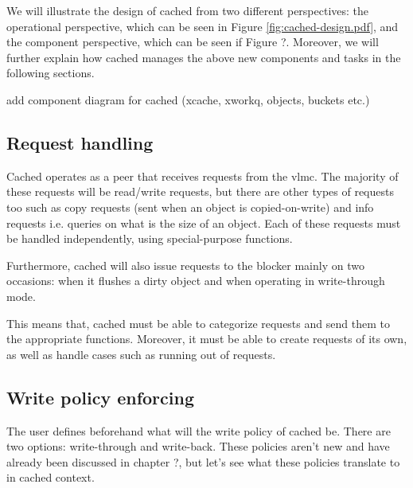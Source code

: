 We will illustrate the design of cached from two different perspectives: the 
operational perspective, which can be seen in Figure 
\ref{fig:cached-design.pdf}, and the component perspective, which can be seen 
if Figure ?. Moreover, we will further explain how cached manages the above new 
components and tasks in the following sections.


\fixme add component diagram for cached (xcache, xworkq, objects, buckets etc.)

\subsection{Request handling}

Cached operates as a peer that receives requests from the vlmc. The majority of 
these requests will be read/write requests, but there are other types of 
requests too such as copy requests (sent when an object is copied-on-write) and 
info requests i.e. queries on what is the size of an object. Each of these 
requests must be handled independently, using special-purpose functions.

Furthermore, cached will also issue requests to the blocker mainly on two 
occasions: when it flushes a dirty object and when operating in write-through 
mode.

This means that, cached must be able to categorize requests and send them to 
the appropriate functions. Moreover, it must be able to create requests of its 
own, as well as handle cases such as running out of requests.

\subsection{Write policy enforcing}\label{sec:cached-wcp-design}

The user defines beforehand what will the write policy of cached be. There are 
two options: write-through and write-back. These policies aren't new and have 
already been discussed in chapter ?, but let's see what these policies 
translate to in cached context.


